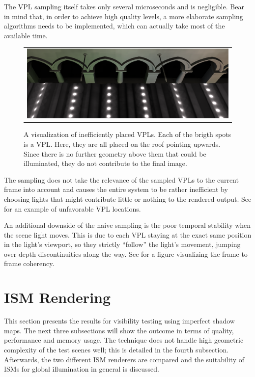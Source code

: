 The VPL sampling itself takes only several microseconds and is negligible. Bear in mind that, in order to achieve high quality levels, a more elaborate sampling algorithms needs to be implemented, which can actually take most of the available time.

\begin{figure}[htb]
\centering
  \begin{tabular}{@{}c@{}}
    \includegraphics[width=1.0\textwidth]{screenshots/RSM_unfavorable} \\
  \end{tabular}
  \caption{A visualization of inefficiently placed VPLs. Each of the brigth spots is a VPL. Here, they are all placed on the roof pointing upwards. Since there is no further geometry above them that could be illuminated, they do not contribute to the final image.}
  \label{fig:results:RSMUnfavorable}
\end{figure}

The sampling does not take the relevance of the sampled VPLs to the current frame into account and causes the entire system to be rather inefficient by choosing lights that might contribute little or nothing to the rendered output. See  for an example of unfavorable VPL locations.

An additional downside of the naive sampling is the poor temporal stability when the scene light moves. This is due to each VPL staying at the exact same position in the light's viewport, so they strictly ``follow'' the light's movement, jumping over depth discontinuities along the way. See  for a figure visualizing the frame-to-frame coherency.



\section{ISM Rendering}

This section presents the results for visibility testing using imperfect shadow maps. The next three subsections will show the outcome in terms of quality, performance and memory usage. The technique does not handle high geometric complexity of the test scenes well; this is detailed in the fourth subsection. Afterwards, the two different ISM renderers are compared and the suitability of ISMs for global illumination in general is discussed.


